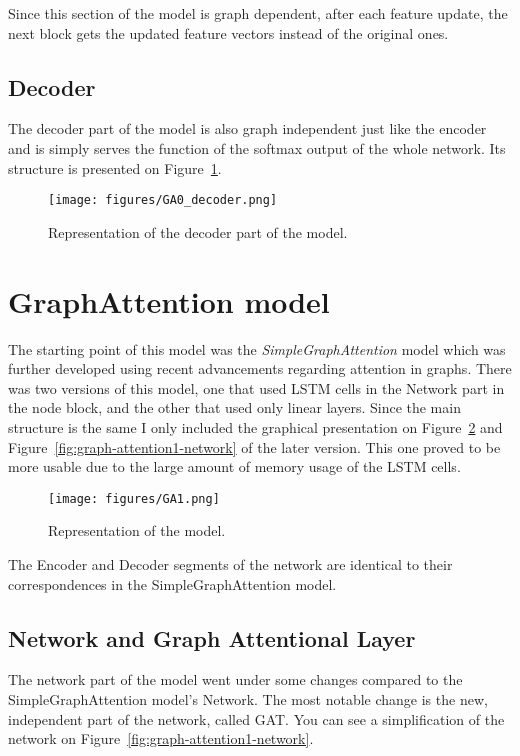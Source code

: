 Since this section of the model is graph dependent, after each feature update, the next block gets the updated feature vectors instead of the original ones.

\subsection{Decoder}

The decoder part of the model is also graph independent just like the encoder and is simply serves the function of the softmax output of the whole network. Its structure is presented on Figure~\ref{fig:graph-attention0-decoder}.

\begin{figure}[!ht]
	\centering
	\texttt{[image: figures/GA0\_decoder.png]}
	\caption{Representation of the decoder part of the model.}
	\label{fig:graph-attention0-decoder}
\end{figure}

\section{GraphAttention model}
The starting point of this model was the \textit{SimpleGraphAttention} model which was further developed using recent advancements regarding attention in graphs. There was two versions of this model, one that used LSTM cells in the Network part in the node block, and the other that used only linear layers. Since the main structure is the same I only included the graphical presentation on Figure~\ref{fig:graph-attention1} and Figure~\ref{fig:graph-attention1-network} of the later version. This one proved to be more usable due to the large amount of memory usage of the LSTM cells.

\begin{figure}[!ht]
	\centering
	\texttt{[image: figures/GA1.png]}
	\caption{Representation of the model.}
	\label{fig:graph-attention1}
\end{figure}


The Encoder and Decoder segments of the network are identical to their correspondences in the SimpleGraphAttention model.

\subsection{Network and Graph Attentional Layer}
The network part of the model went under some changes compared to the SimpleGraphAttention model's Network. The most notable change is the new, independent part of the network, called GAT. You can see a simplification of the network on Figure~\ref{fig:graph-attention1-network}.

